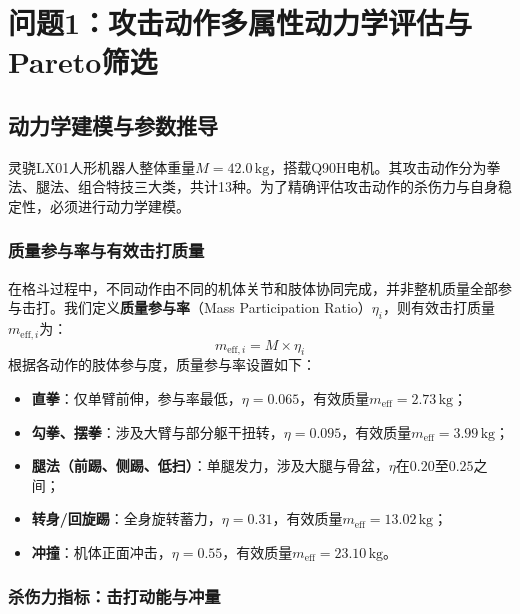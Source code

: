 \documentclass[a4paper,12pt]{article}
\numberwithin{equation}{section}
\numberwithin{table}{section}
\numberwithin{figure}{section}
\begin{document}
\section{问题1：攻击动作多属性动力学评估与Pareto筛选}

\subsection{动力学建模与参数推导}

灵骁LX01人形机器人整体重量$M = 42.0\,\text{kg}$，搭载Q90H电机。其攻击动作分为拳法、腿法、组合特技三大类，共计13种。为了精确评估攻击动作的杀伤力与自身稳定性，必须进行动力学建模。

\subsubsection{质量参与率与有效击打质量}

在格斗过程中，不同动作由不同的机体关节和肢体协同完成，并非整机质量全部参与击打。我们定义\textbf{质量参与率}（Mass Participation Ratio）$\eta_i$，则有效击打质量$m_{\text{eff}, i}$为：
\begin{equation}
    m_{\text{eff}, i} = M \times \eta_i
    \label{eq:meff}
\end{equation}
根据各动作的肢体参与度，质量参与率设置如下：
\begin{itemize}
    \item \textbf{直拳}：仅单臂前伸，参与率最低，$\eta = 0.065$，有效质量$m_{\text{eff}} = 2.73\,\text{kg}$；
    \item \textbf{勾拳、摆拳}：涉及大臂与部分躯干扭转，$\eta = 0.095$，有效质量$m_{\text{eff}} = 3.99\,\text{kg}$；
    \item \textbf{腿法（前踢、侧踢、低扫）}：单腿发力，涉及大腿与骨盆，$\eta$在$0.20$至$0.25$之间；
    \item \textbf{转身/回旋踢}：全身旋转蓄力，$\eta = 0.31$，有效质量$m_{\text{eff}} = 13.02\,\text{kg}$；
    \item \textbf{冲撞}：机体正面冲击，$\eta = 0.55$，有效质量$m_{\text{eff}} = 23.10\,\text{kg}$。
\end{itemize}

\subsubsection{杀伤力指标：击打动能与冲量}
\end{document}
